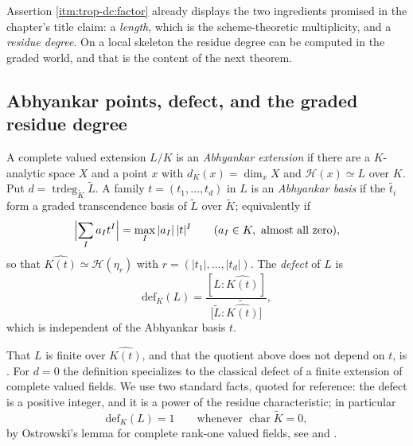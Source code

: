 Assertion \cref{itm:trop-dc:factor} already displays the two ingredients
promised in the chapter's title claim: a \emph{length}, which is the
scheme-theoretic multiplicity, and a \emph{residue degree}. On a local
skeleton the residue degree can be computed in the graded world, and that is
the content of the next theorem.

\subsection{Abhyankar points, defect, and the graded residue degree}

\begin{definition}
\label{def:trop-abhyankar-defect}
A complete valued extension $L/K$ is an \emph{Abhyankar extension} if there
are a $K$-analytic space $X$ and a point $x$ with $d_K(x)=\dim_xX$ and
$\mathcal H(x)\simeq L$ over $K$. Put
$d=\operatorname{trdeg}_{\widetilde K}\widetilde L$. A family
$t=(t_1,\ldots,t_d)$ in $L$ is an \emph{Abhyankar basis} if
the $\widetilde{t_i}$ form a graded transcendence basis of $\widetilde L$
over $\widetilde K$; equivalently if
\[
 \Bigl|\sum_Ia_It^I\Bigr|=\max_I|a_I|\,|t|^I
 \qquad(a_I\in K,\ \text{almost all zero}),
\]
so that $\widehat{K(t)}\simeq\mathcal H(\eta_r)$ with
$r=(|t_1|,\ldots,|t_d|)$. The \emph{defect} of $L$ is
\[
 \mathrm{def}_K(L)
 =\frac{[L:\widehat{K(t)}]}
 {\bigl[\widetilde L:\widetilde{\widehat{K(t)}}\bigr]},
\]
which is independent of the Abhyankar basis $t$.
\end{definition}

That $L$ is finite over $\widehat{K(t)}$, and that the quotient above does
not depend on $t$, is \cite[Lemma~13.8.6 and Theorem~13.8.10]{CLD25}. For
$d=0$ the definition specializes to the classical defect of a finite
extension of complete valued fields. We use two standard facts, quoted for
reference: the defect is a positive integer, and it is a power of the
residue characteristic; in particular
\begin{equation}
\label{eq:trop-defect-trivial}
 \mathrm{def}_K(L)=1
 \qquad\text{whenever }\operatorname{char}\widetilde K=0,
\end{equation}
by Ostrowski's lemma for complete rank-one valued fields, see
\cite[Ch.~VI]{ZariskiSamuelII} and \cite[\S13.8]{CLD25}.

